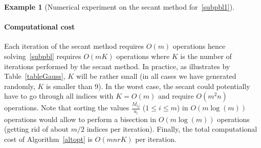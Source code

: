 \documentclass[a4paper,11pt]{article}
\newtheorem{example}{Example}
\numberwithin{equation}{section}
\begin{document}
\begin{example}[Numerical experiment on the secant method for~\eqref{subpbl1}]
\end{example}

\paragraph{Computational cost} Each iteration of the secant method requires $O(m)$ operations hence solving~\eqref{subpbl} requires $O(mK)$ operations where $K$ is the number of iterations performed by the secant method. In practice, as illustrates by Table~\ref{tableGauss}, $K$ will be rather small 
(in all cases we have generated randomly, $K$ is smaller than 9). 
In the worst case, the secant could potentially have to go through all indices with $K = O(m)$ and require $O(m^2n)$ operations. Note that sorting the values $\frac{M_{ij}}{u_i}$ ($1 \leq i \leq m$) in $O(m\log(m))$ operations would allow to perform a bisection in $O(m \log(m))$ operations (getting rid of about $m/2$ indices per iteration). Finally, the total computational cost of Algorithm~\ref{altopt} is $O(mnrK)$ per iteration. 
\end{document}

